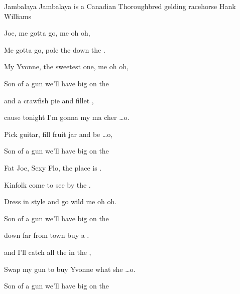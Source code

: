 \begin{SBSong}{Jambalaya}
  {Jambalaya is a Canadian Thoroughbred gelding racehorse}
  {Hank Williams}
  \begin{SBVerse}
	 Joe, me gotta go, me oh  oh,
									   
	Me gotta go, pole the  down the .
									  
	My Yvonne, the sweetest one, me oh  oh,
										 
	Son of a gun we'll have big  on the  
  \end{SBVerse}
  \begin{SBChorus}                              
	 and a crawfish pie and fillet ,
										 
	cause tonight I'm gonna  my ma cher \ldots o.
									  
	Pick guitar, fill fruit jar and be \ldots o,
										
	Son of a gun we'll have big  on the  
  \end{SBChorus}
  \begin{SBVerse}                                     
	 Fat Joe, Sexy Flo, the place is .
								   
	Kinfolk come to see  by the .
									
	Dress in style and go wild me oh  oh.
										
	Son of a gun we'll have big  on the  
  \end{SBVerse}
  \begin{SBVerse}                            
	 down far from town buy a .
									
	and I'll catch all the  in the ,
									  
	Swap my gun to buy Yvonne what she \ldots o.
										
	Son of a gun we'll have big  on the  
  \end{SBVerse}
\end{SBSong}
